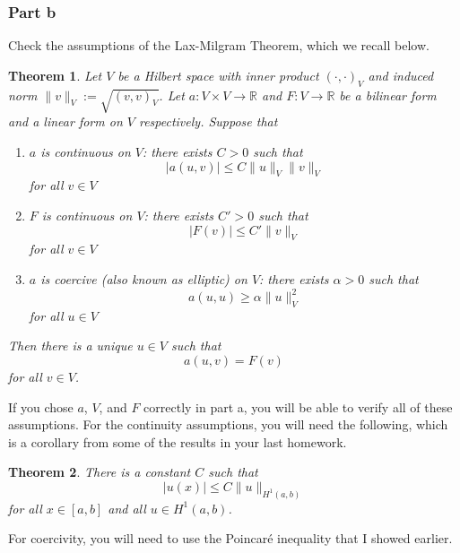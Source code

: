 \documentclass{article}
\theoremstyle{definition}
\theoremstyle{plain}
\newtheorem{theorem}{Theorem}
\begin{document}
\subsubsection{Part b}
Check the assumptions of the Lax-Milgram Theorem, which we recall below.
\begin{theorem}
    Let $V$ be a Hilbert space with inner product $(\cdot,\cdot)_V$ and induced norm $\|v\|_V := \sqrt{(v,v)_V}$.
    Let $a:V\times V\to\mathbb R$ and $F:V\to\mathbb R$ be a bilinear form and a linear form on $V$ respectively.
    Suppose that 
    \begin{enumerate}
        \item $a$ is continuous on $V$: there exists $C > 0$ such that 
        \begin{equation}
            |a(u,v)| \leq C\|u\|_V\|v\|_V
        \end{equation}
        for all $v \in V$
        \item $F$ is continuous on $V$: there exists $C' > 0$ such that 
        \begin{equation}
            |F(v)| \leq C'\|v\|_V
        \end{equation}
        for all $v \in V$
        \item $a$ is coercive (also known as elliptic) on $V$: there exists $\alpha > 0$ such that 
        \begin{equation}
            a(u,u) \geq \alpha \|u\|_V^2
        \end{equation}
        for all $u \in V$
    \end{enumerate}
    Then there is a unique $u \in V$ such that 
    \begin{equation}
        a(u,v) = F(v)
    \end{equation}
    for all $v\in V$.
\end{theorem}
If you chose $a$, $V$, and $F$ correctly in part a, you will be able to verify all of these assumptions.
For the continuity assumptions, you will need the following, which is a corollary from some of the results in your last homework.
\begin{theorem}
    There is a constant $C$ such that 
    \begin{equation}
        |u(x)| \leq C\|u\|_{H^1(a,b)}
    \end{equation}
    for all $x \in [a,b]$ and all $u \in H^1(a,b)$.
\end{theorem}
For coercivity, you will need to use the Poincar\'e inequality that I showed earlier.
\end{document}
